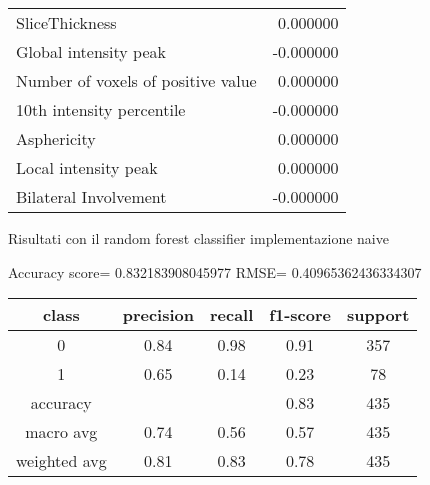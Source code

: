 \begin{tabular}{lr}
SliceThickness                      &          0.000000 \\
Global intensity peak               &         -0.000000 \\
Number of voxels of positive value  &          0.000000 \\
10th intensity percentile           &         -0.000000 \\
Asphericity                         &          0.000000 \\
Local intensity peak                &          0.000000 \\
Bilateral Involvement               &         -0.000000 \\
\bottomrule
\end{tabular}

Risultati con il random forest classifier implementazione naive



Accuracy score= 0.832183908045977
RMSE= 0.40965362436334307

\begin{tabular}{|c|c|c|c|c|}
\toprule
class     &  precision &    recall  &  f1-score   &  support \\
\midrule
0     &    0.84   &     0.98    &    0.91      &   357 \\
1      &   0.65    &    0.14   &     0.23    &      78 \\
\hline
accuracy       &           &         &      0.83    &     435 \\
macro avg    &   0.74    &    0.56    &    0.57      &   435 \\
weighted avg   &    0.81   &     0.83      &  0.78    &    435 \\
\bottomrule
\end{tabular}



